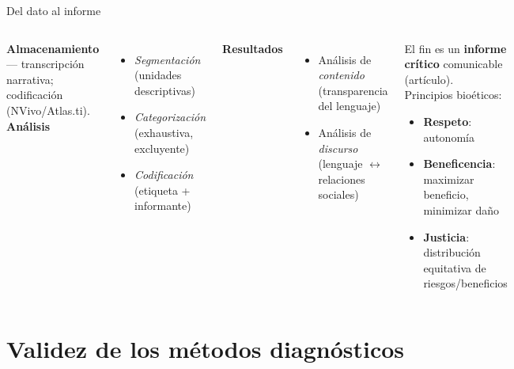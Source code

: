 \documentclass[aspectratio=169,8pt]{beamer}
\begin{document}
\begin{frame}{Del dato al informe}
  \small
  \begin{columns}[T,onlytextwidth]
      \textbf{Almacenamiento} --- transcripci\'on narrativa; codificaci\'on (NVivo/Atlas.ti).\\[4pt]
      \textbf{An\'alisis}
      \begin{itemize}
        \item \emph{Segmentaci\'on} (unidades descriptivas)
        \item \emph{Categorizaci\'on} (exhaustiva, excluyente)
        \item \emph{Codificaci\'on} (etiqueta + informante)
      \end{itemize}
      \textbf{Resultados}
      \begin{itemize}
        \item An\'alisis de \emph{contenido} (transparencia del lenguaje)
        \item An\'alisis de \emph{discurso} (lenguaje $\leftrightarrow$ relaciones sociales)
      \end{itemize}
      \begin{tcolorbox}[formulabox,title=Informe + \'etica]
        \footnotesize
        El fin es un \textbf{informe cr\'itico} comunicable (art\'iculo).\\[2pt]
        Principios bio\'eticos:
        \begin{itemize}
          \item \textbf{Respeto}: autonom\'ia
          \item \textbf{Beneficencia}: maximizar beneficio, minimizar da\~no
          \item \textbf{Justicia}: distribuci\'on equitativa de riesgos/beneficios
        \end{itemize}
      \end{tcolorbox}
    \end{columns}
\end{frame}

\section{Validez de los m\'etodos diagn\'osticos}
\end{document}
